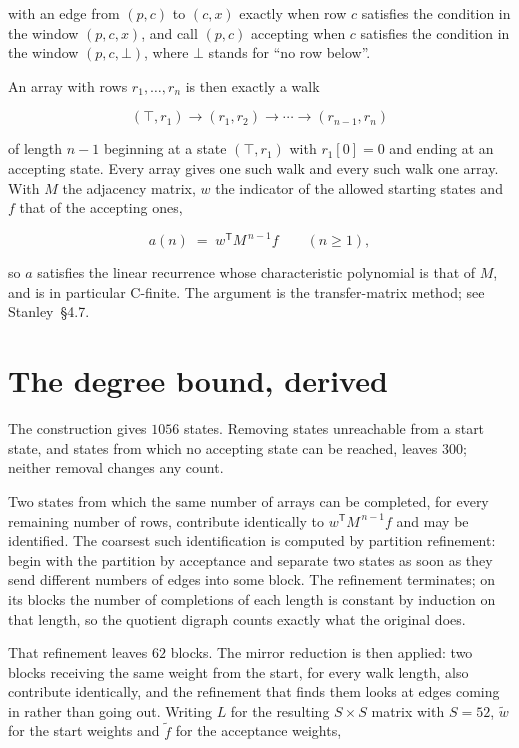 \documentclass[11pt]{article}
\theoremstyle{definition}
\begin{document}
with an edge from $(p,c)$ to $(c,x)$ exactly when row $c$ satisfies the condition in the window $(p,c,x)$, and call $(p,c)$ accepting when $c$ satisfies the condition in the window $(p,c,\bot)$, where $\bot$ stands for ``no row below''.

An array with rows $r_1,\dots,r_n$ is then exactly a walk

\[(\top,r_1) \to (r_1,r_2) \to \cdots \to (r_{n-1},r_n)\]

of length $n-1$ beginning at a state $(\top,r_1)$ with $r_1[0]=0$ and ending at an accepting state. Every array gives one such walk and every such walk one array. With $M$ the adjacency matrix, $w$ the indicator of the allowed starting states and $f$ that of the accepting ones,

\[a(n) \;=\; w^{\mathsf T} M^{\,n-1} f \qquad (n \ge 1),\]

so $a$ satisfies the linear recurrence whose characteristic polynomial is that of $M$, and is in particular C-finite. The argument is the transfer-matrix method; see Stanley~\S4.7.

\section{The degree bound, derived}

The construction gives $1056$ states. Removing states unreachable from a start state, and states from which no accepting state can be reached, leaves $300$; neither removal changes any count.

Two states from which the same number of arrays can be completed, for every remaining number of rows, contribute identically to $w^{\mathsf T}M^{\,n-1}f$ and may be identified. The coarsest such identification is computed by partition refinement: begin with the partition by acceptance and separate two states as soon as they send different numbers of edges into some block. The refinement terminates; on its blocks the number of completions of each length is constant by induction on that length, so the quotient digraph counts exactly what the original does.

That refinement leaves $62$ blocks. The mirror reduction is then applied: two blocks receiving the same weight from the start, for every walk length, also contribute identically, and the refinement that finds them looks at edges coming in rather than going out. Writing $L$ for the resulting $S \times S$ matrix with $S = 52$, $\tilde w$ for the start weights and $\tilde f$ for the acceptance weights,
\end{document}
